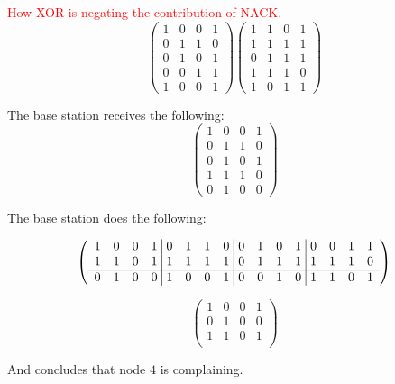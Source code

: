 	\textcolor{red}{How XOR is negating the contribution of NACK.}
	\[ 
		\left( 
			\begin{array}{cccc}
				1 & 0 & 0 & 1 \\ 
				0 & 1 & 1 & 0 \\
				0 & 1 & 0 & 1 \\
				0 & 0 & 1 & 1 \\
				\hline
				1 & 0 & 0 & 1 
			\end{array}
		\right)
		\left( 
			\begin{array}{cccc}
				1 & 1 & 0 & 1 \\ 
				1 & 1 & 1 & 1 \\
				0 & 1 & 1 & 1 \\
				1 & 1 & 1 & 0 \\
				\hline
				1 & 0 & 1 & 1 
			\end{array}
		\right)
	\]

	The base station receives the following:
	\[ 
		\left( 
			\begin{array}{cccc}
				1 & 0 & 0 & 1 \\ 
				0 & 1 & 1 & 0 \\
				0 & 1 & 0 & 1 \\
				1 & 1 & 1 & 0 \\
				\hline
				0 & 1 & 0 & 0 
			\end{array}
		\right)
	\]

	The base station does the following:

	\[
		\left( 
			\begin{array}{cccc cccc cccc cccc}
				1 & 0 & 0 & 1\ \vline\  0 & 1 & 1 & 0\ \vline\  0 & 1 & 0 & 1\ \vline\  0 & 0 & 1 & 1 \\
				1 & 1 & 0 & 1\ \vline\  1 & 1 & 1 & 1\ \vline\	0 & 1 & 1 & 1\ \vline\	1 & 1 & 1 & 0 \\ 
				\hline
				0 & 1 & 0 & 0\ \vline\ 1 & 0 & 0 & 1\ \vline\ 0 & 0 & 1 & 0\ \vline\ 1 & 1 & 0 & 1\\
			\end{array}
		\right)
	\]

	\[ 
		\left( 
			\begin{array}{cccc}
				1 & 0 & 0 & 1 \\ 
				0 & 1 & 0 & 0 \\
				\hline
				1 & 1 & 0 & 1 \\
			\end{array}
		\right)
	\]

	And concludes that node $4 $ is complaining.
\newpage
